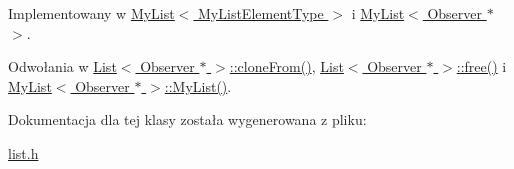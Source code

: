 Implementowany w \hyperlink{class_my_list_a267f669859ef3541333082cad6b28ab7}{My\-List$<$ My\-List\-Element\-Type $>$} i \hyperlink{class_my_list_a267f669859ef3541333082cad6b28ab7}{My\-List$<$ Observer $\ast$ $>$}.



Odwołania w \hyperlink{list_8h_source_l00031}{List$<$ Observer $\ast$ $>$\-::clone\-From()}, \hyperlink{list_8h_source_l00040}{List$<$ Observer $\ast$ $>$\-::free()} i \hyperlink{mylist_8h_source_l00048}{My\-List$<$ Observer $\ast$ $>$\-::\-My\-List()}.



Dokumentacja dla tej klasy została wygenerowana z pliku\-:\begin{DoxyCompactItemize}
\item 
\hyperlink{list_8h}{list.\-h}\end{DoxyCompactItemize}
